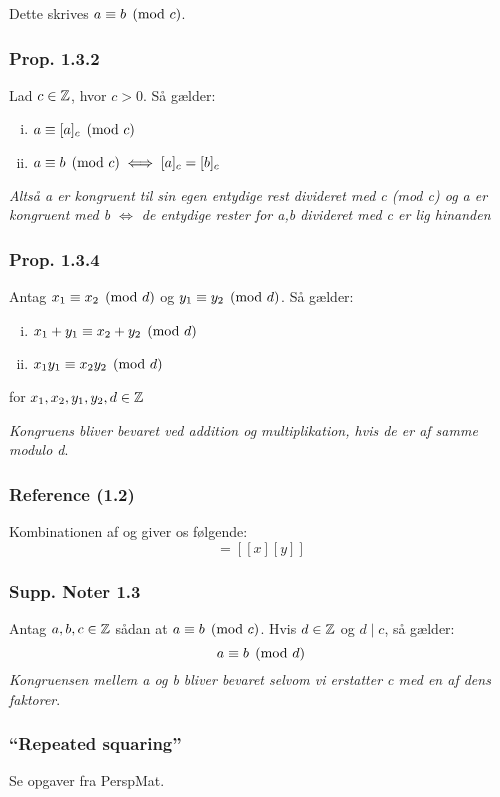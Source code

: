 Dette skrives $a \equiv b \pmod{c}$.

\subsubsection{Prop. 1.3.2}
\label{1.3.2}
Lad $c \in \mathbb{Z}$, hvor $c > 0$. Så gælder:
\begin{enumerate}[(i)]
  \item $a \equiv [a]_c \pmod{c}$
  \item $a \equiv b \pmod{c} \iff [a]_c = [b]_c$
\end{enumerate}
\textit{Altså a er kongruent til sin egen entydige rest divideret med c (mod c)
og a er kongruent med b $\iff$ de entydige rester for a,b divideret med c er lig
hinanden}

\subsubsection{Prop. 1.3.4}
\label{1.3.4}
Antag $x_1 \equiv x_2 \pmod{d}$ og $y_1 \equiv y_2 \pmod{d}$. Så gælder:
\begin{enumerate}[(i)]
  \item $x_1 + y_1 \equiv x_2 + y_2 \pmod{d}$
  \item $x_1 y_1 \equiv x_2 y_2 \pmod{d}$
\end{enumerate}
for $x_1, x_2, y_1, y_2, d \in \mathbb{Z}$

\textit{Kongruens bliver bevaret ved addition og multiplikation, hvis de er af
samme modulo d}.

\subsubsection{Reference (1.2)}
\label{(1.2)}
Kombinationen af  og  giver os følgende:
\begin{equation*}
  [xy] = [[x][y]]
\end{equation*}

\subsubsection{Supp. Noter 1.3}
Antag $a, b, c \in \mathbb{Z}$ sådan at $a \equiv b \pmod{c}$. Hvis $d \in \mathbb{Z}$ og $d \mid
c$, så gælder:
\begin{equation*}
  a \equiv b \pmod{d}
\end{equation*}
\textit{Kongruensen mellem a og b bliver bevaret selvom vi erstatter c med en
af dens faktorer}.

\subsubsection{``Repeated squaring''}
Se opgaver fra PerspMat.


